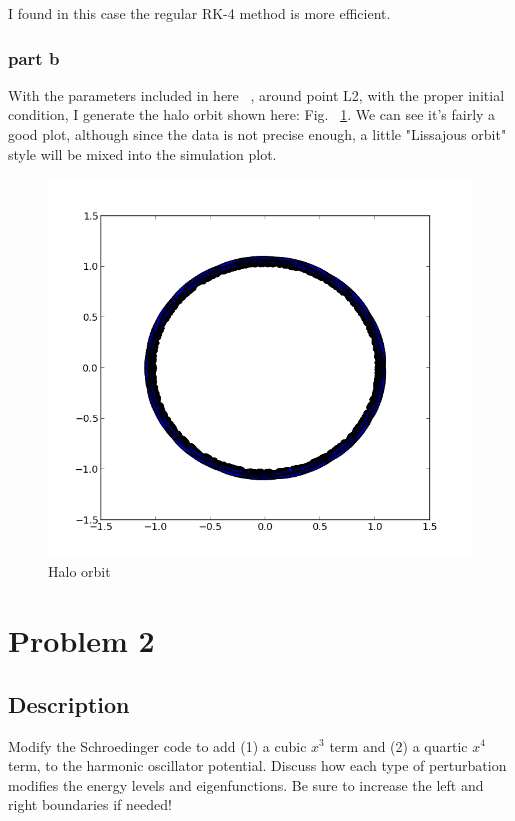 \documentclass[11pt,letterpaper]{article}
\begin{document}
I found in this case the regular RK-4 method is more efficient.

\subsubsection{part b}

With the parameters included in here ~\cite{Lpoint}, around point L2, with the proper initial condition, I generate the halo orbit shown here: Fig. ~\ref{figure3}. We can see it's fairly a good plot, although since the data is not precise enough, a little "Lissajous orbit" style will be mixed into the simulation plot.

\begin{figure}
\begin{center}
\includegraphics[width=0.8\linewidth,angle=0]{halo.png}
\caption{Halo orbit}
\label{figure3}
\end{center}
\end{figure}

\newpage

\section{Problem 2}

\subsection{Description}
Modify the Schroedinger code to add (1) a cubic $x^3$ term and (2) a quartic $x^4$ term, to the harmonic oscillator potential. Discuss how each type of perturbation modifies the energy levels and eigenfunctions. Be sure to increase the left and right boundaries if needed! 
\end{document}
